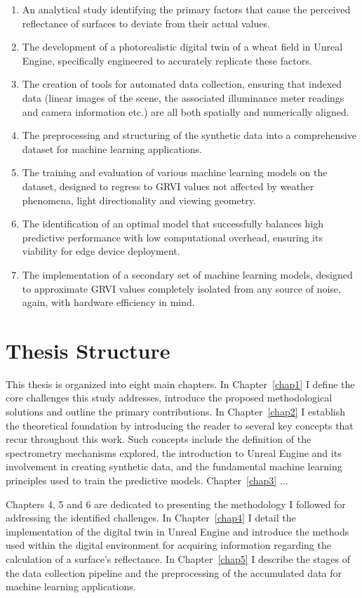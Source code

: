 \begin{enumerate}
\item An analytical study identifying the primary factors that cause the perceived reflectance of surfaces to deviate from their actual values.  
\item The development of a photorealistic digital twin of a wheat field in Unreal Engine, specifically engineered to accurately replicate these factors.
\item The creation of tools for automated data collection, ensuring that indexed data (linear images of the scene, the associated illuminance meter readings and camera information etc.) are all both spatially and numerically  aligned.
\item The preprocessing and structuring of the synthetic data into a comprehensive dataset for machine learning applications. 
\item The training and evaluation of various machine learning models on the dataset, designed to regress to GRVI values not affected by weather phenomena, light directionality and viewing geometry. 
\item The identification of an optimal model that successfully balances high predictive performance with low computational overhead, ensuring its viability for edge device deployment.
\item The implementation of a secondary set of machine learning models, designed to approximate GRVI values completely isolated from any source of noise, again, with hardware efficiency in mind. 
\end{enumerate}


\section{Thesis Structure}

This thesis is organized into eight main chapters. In Chapter~\ref{chap1} I define the core challenges this study addresses, introduce the proposed methodological solutions and outline the primary contributions. In Chapter~\ref{chap2} I establish the theoretical foundation by introducing the reader to several key concepts that recur throughout this work. Such concepts include the definition of the spectrometry mechanisms explored, the introduction to Unreal Engine and its involvement in creating synthetic data, and the fundamental machine learning principles used to train the predictive models. Chapter~\ref{chap3} ...

Chapters 4, 5 and 6 are dedicated to presenting the methodology I followed for addressing the identified challenges. In Chapter~\ref{chap4} I detail the implementation of the digital twin in Unreal Engine and introduce the methods used within the digital environment for acquiring information regarding the calculation of a surface's reflectance. In Chapter~\ref{chap5} I describe the stages of the data collection pipeline and the preprocessing of the accumulated data for machine learning applications.